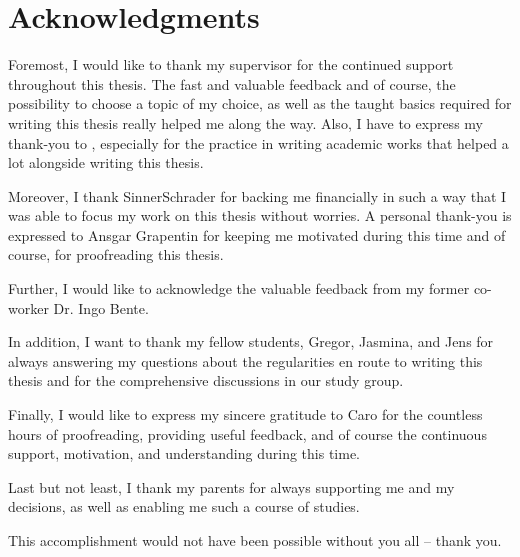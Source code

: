\chapter*{Acknowledgments}
\thispagestyle{noheader}

Foremost, I would like to thank my supervisor \firstTutor{} for the continued support throughout this thesis. The fast and valuable feedback and of course, the possibility to choose a topic of my choice, as well as the taught basics required for writing this thesis really helped me along the way. Also, I have to express my thank-you to \secondTutor, especially for the practice in writing academic works that helped a lot alongside writing this thesis.

Moreover, I thank SinnerSchrader for backing me financially in such a way that I was able to focus my work on this thesis without worries. A personal thank-you is expressed to Ansgar Grapentin for keeping me motivated during this time and of course, for proofreading this thesis.

Further, I would like to acknowledge the valuable feedback from my former co-worker Dr. Ingo Bente.

In addition, I want to thank my fellow students, Gregor, Jasmina, and Jens for always answering my questions about the regularities en route to writing this thesis and for the comprehensive discussions in our study group.

Finally, I would like to express my sincere gratitude to Caro for the countless hours of proofreading, providing useful feedback, and of course the continuous support, motivation, and understanding during this time.

Last but not least, I thank my parents for always supporting me and my decisions, as well as enabling me such a course of studies.

This accomplishment would not have been possible without you all -- thank you.

\newpage